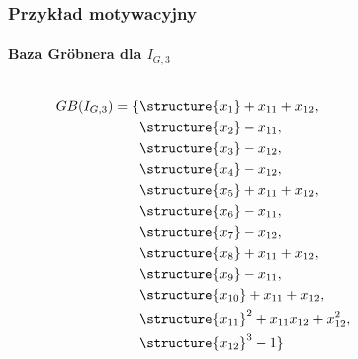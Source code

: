 \documentclass{beamer}
\begin{document}
\begin{frame}
    \frametitle{Przykład motywacyjny}
    \framesubtitle{Baza Gr\"{o}bnera dla $I_{G,3}$}

    \begin{columns}
        \begin{column}[l]{0.4\textwidth}
            \scriptsize
            \begin{align*}
                GB(I_{G,3}) =
                \{& \structure{x_{1}} + x_{11} + x_{12},              \\
                  & \structure{x_{2}} - x_{11},                       \\
                  & \structure{x_{3}} - x_{12},                       \\
                  & \structure{x_{4}} - x_{12},                       \\
                  & \structure{x_{5}} + x_{11} + x_{12},              \\
                  & \structure{x_{6}} - x_{11},                       \\
                  & \structure{x_{7}} - x_{12},                       \\
                  & \structure{x_{8}} + x_{11} + x_{12},              \\
                  & \structure{x_{9}} - x_{11},                       \\
                  & \structure{x_{10}} + x_{11} + x_{12},             \\
                  & \structure{x_{11}}^2 + x_{11} x_{12} + x_{12}^2,  \\
                  & \structure{x_{12}}^3 - 1 \}
            \end{align*}
        \end{column}
        \begin{column}[r]{0.4\textwidth}
            \begin{center}
                
            \end{center}
        \end{column}
    \end{columns}
\end{frame}
\end{document}
